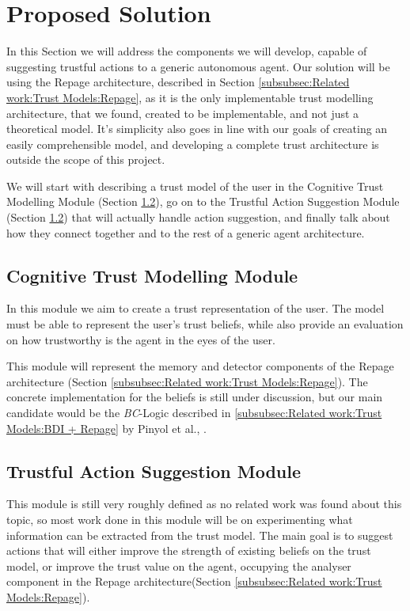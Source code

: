 \section{Proposed Solution}
\label{sec:Solution}
In this Section we will address the components we will develop, capable of suggesting trustful actions to a generic autonomous agent. Our solution will be using the Repage architecture, described in Section \ref{subsubsec:Related work:Trust Models:Repage}, as it is the only implementable trust modelling architecture, that we found, created to be implementable, and not just a theoretical model. It's simplicity also goes in line with our goals of creating an easily comprehensible model, and developing a complete trust architecture is outside the scope of this project.

We will start with describing a trust model of the user in the Cognitive Trust Modelling Module (Section \ref{subsec:Solution:Trust Decision Making Module}), go on to the Trustful Action Suggestion Module (Section \ref{subsec:Solution:Trust Decision Making Module}) that will actually handle action suggestion, and finally talk about how they connect together and to the rest of a generic agent architecture.


\subsection{Cognitive Trust Modelling Module}
\label{subsec:Solution:Trust Assessment Module}
In this module we aim to create a trust representation of the user. The model must be able to represent the user's trust beliefs, while also provide an evaluation on how trustworthy is the agent in the eyes of the user. 

This module will represent the memory and detector components of the Repage architecture (Section \ref{subsubsec:Related work:Trust Models:Repage}). The concrete implementation for the beliefs is still under discussion, but our main candidate would be the \textit{BC}-Logic described in \ref{subsubsec:Related work:Trust Models:BDI + Repage} by Pinyol et al., \cite{Pinyol2009}.

\subsection{Trustful Action Suggestion Module}
\label{subsec:Solution:Trust Decision Making Module}
This module is still very roughly defined as no related work was found about this topic, so most work done in this module will be on experimenting what information can be extracted from the trust model. The main goal is to suggest actions that will either improve the strength of existing beliefs on the trust model, or improve the trust value on the agent, occupying the analyser component in the Repage architecture(Section \ref{subsubsec:Related work:Trust Models:Repage}).


